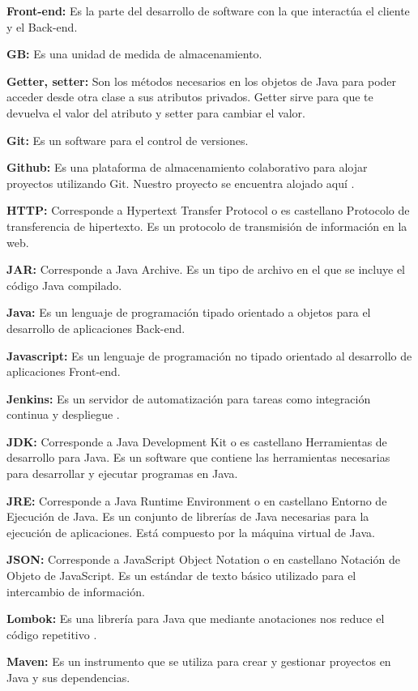 \documentclass[12pt]{report} %
\begin{document}
\textbf{Front-end:} Es la parte del desarrollo de software con la que interactúa el cliente y el Back-end.

\textbf{GB:} Es una unidad de medida de almacenamiento.

\textbf{Getter, setter:} Son los métodos necesarios en los objetos de Java para poder acceder desde otra clase a sus atributos privados. Getter sirve para que te devuelva el valor del atributo y setter para cambiar el valor.

\textbf{Git:} Es un software para el control de versiones. 

\textbf{Github:} Es una plataforma de almacenamiento colaborativo para alojar proyectos utilizando Git. Nuestro proyecto se encuentra alojado aquí \cite{repositorio}.

\textbf{HTTP:} Corresponde a Hypertext Transfer Protocol o es castellano Protocolo de transferencia de hipertexto. Es un protocolo de transmisión de información en la web.

\textbf{JAR:} Corresponde a Java Archive. Es un tipo de archivo en el que se incluye el código Java compilado.

\textbf{Java:} Es un lenguaje de programación tipado orientado a objetos para el desarrollo de aplicaciones Back-end.

\textbf{Javascript:} Es un lenguaje de programación no tipado orientado al desarrollo de aplicaciones Front-end.

\textbf{Jenkins:} Es un servidor de automatización para tareas como integración continua y despliegue \cite{jenkins}.

\textbf{JDK:} Corresponde a Java Development Kit o es castellano Herramientas de desarrollo para Java. Es un software que contiene las herramientas necesarias para desarrollar y ejecutar programas en Java.

\textbf{JRE:} Corresponde a Java Runtime Environment o en castellano Entorno de Ejecución de Java. Es un conjunto de librerías de Java necesarias para la ejecución de aplicaciones. Está compuesto por la máquina virtual de Java.

\textbf{JSON:} Corresponde a JavaScript Object Notation o en castellano Notación de Objeto de JavaScript. Es un estándar de texto básico utilizado para el intercambio de información.

\textbf{Lombok:} Es una librería para Java que mediante anotaciones nos reduce el código repetitivo \cite{lombok}. 

\textbf{Maven:} Es un instrumento que se utiliza para crear y gestionar proyectos en Java y sus dependencias.
\end{document}
